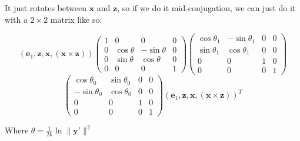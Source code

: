 \documentclass[12pt]{amsart}
\begin{document}
It just rotates between $\textbf{x}$ and $\textbf{z}$, so if we do it mid-conjugation, we can just do it with a $2 \times 2$ matrix like so:

$$(\textbf{e}_1,\textbf{z},\textbf{x},(\textbf{x} \times \textbf{z}))
\left(\begin{array}{cccc} 1 & 0 & 0 & 0 \\ 0 & \cos\theta & -\sin\theta & 0 \\ 0 & \sin\theta & \cos\theta & 0 \\ 0 & 0 & 0 & 1 \end{array} \right)
\left(\begin{array}{cccc} \cos\theta_1 & -\sin\theta_1 & 0 & 0 \\ \sin\theta_1 & \cos\theta_1 & 0 & 0 \\ 0 & 0 & 1 & 0 \\ 0 & 0 & 0 & 1 \end{array} \right)$$ $$
\left(\begin{array}{cccc} \cos\theta_0 & \sin\theta_0 & 0 & 0 \\ -\sin\theta_0 & \cos\theta_0 & 0 & 0 \\ 0 & 0 & 1 & 0 \\ 0 & 0 & 0 & 1 \end{array} \right)
(\textbf{e}_1,\textbf{z},\textbf{x},(\textbf{x} \times \textbf{z}))^T$$

Where $\theta = \frac{1}{2k}\ln\|\textbf{y}'\|^2$
\end{document}
